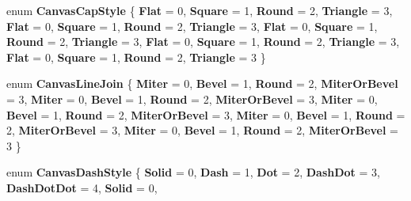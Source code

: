 \begin{DoxyCompactItemize}
\mbox{\label{namespace_microsoft_1_1_graphics_1_1_canvas_1_1_geometry_aceede6fdba7f9ce2af9afb615db0aebf}} 
enum {\bfseries Canvas\+Cap\+Style} \{ \newline
{\bfseries Flat} = 0, 
{\bfseries Square} = 1, 
{\bfseries Round} = 2, 
{\bfseries Triangle} = 3, 
\newline
{\bfseries Flat} = 0, 
{\bfseries Square} = 1, 
{\bfseries Round} = 2, 
{\bfseries Triangle} = 3, 
\newline
{\bfseries Flat} = 0, 
{\bfseries Square} = 1, 
{\bfseries Round} = 2, 
{\bfseries Triangle} = 3, 
\newline
{\bfseries Flat} = 0, 
{\bfseries Square} = 1, 
{\bfseries Round} = 2, 
{\bfseries Triangle} = 3, 
\newline
{\bfseries Flat} = 0, 
{\bfseries Square} = 1, 
{\bfseries Round} = 2, 
{\bfseries Triangle} = 3
 \}
\item 
\mbox{\label{namespace_microsoft_1_1_graphics_1_1_canvas_1_1_geometry_a962f9c8c901a160f4a74f2be716840d7}} 
enum {\bfseries Canvas\+Line\+Join} \{ \newline
{\bfseries Miter} = 0, 
{\bfseries Bevel} = 1, 
{\bfseries Round} = 2, 
{\bfseries Miter\+Or\+Bevel} = 3, 
\newline
{\bfseries Miter} = 0, 
{\bfseries Bevel} = 1, 
{\bfseries Round} = 2, 
{\bfseries Miter\+Or\+Bevel} = 3, 
\newline
{\bfseries Miter} = 0, 
{\bfseries Bevel} = 1, 
{\bfseries Round} = 2, 
{\bfseries Miter\+Or\+Bevel} = 3, 
\newline
{\bfseries Miter} = 0, 
{\bfseries Bevel} = 1, 
{\bfseries Round} = 2, 
{\bfseries Miter\+Or\+Bevel} = 3, 
\newline
{\bfseries Miter} = 0, 
{\bfseries Bevel} = 1, 
{\bfseries Round} = 2, 
{\bfseries Miter\+Or\+Bevel} = 3
 \}
\item 
\mbox{\label{namespace_microsoft_1_1_graphics_1_1_canvas_1_1_geometry_ab285a1e0da5c91c32bbb2fbbec7ad1c0}} 
enum {\bfseries Canvas\+Dash\+Style} \{ \newline
{\bfseries Solid} = 0, 
{\bfseries Dash} = 1, 
{\bfseries Dot} = 2, 
{\bfseries Dash\+Dot} = 3, 
\newline
{\bfseries Dash\+Dot\+Dot} = 4, 
{\bfseries Solid} = 0, 

\end{DoxyCompactItemize}
